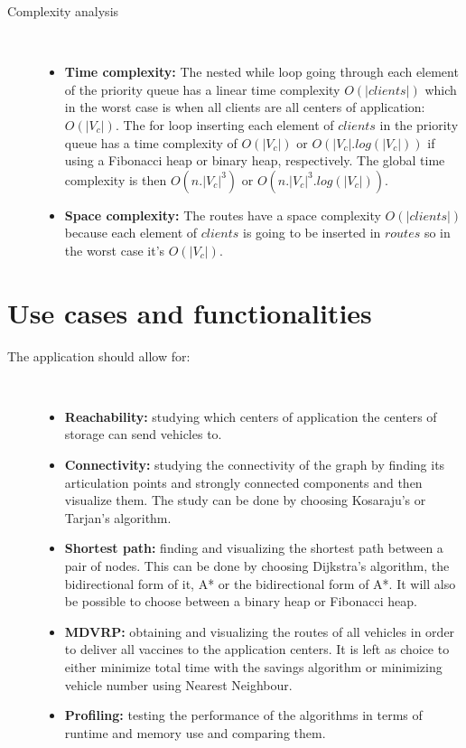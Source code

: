 \documentclass{article}
\begin{document}
\begin{description}
\item[Complexity analysis]\
\begin{itemize}
    \item \textbf{Time complexity:} The nested while loop going through each element of the priority queue has a linear time complexity $O(|clients|)$ which in the worst case is when all clients are all centers of application: $O(|V_c|)$. The for loop inserting each element of $clients$ in the priority queue has a time complexity of $O(|V_c|)$ or $O(|V_c|.log(|V_c|))$ if using a Fibonacci heap or binary heap, respectively. The global time complexity is then $O(n.|V_c|^3)$ or $O(n.|V_c|^3.log(|V_c|))$. 
    \item \textbf{Space complexity:} The routes have a space complexity $O(|clients|)$ because each element of $clients$ is going to be inserted in $routes$ so in the worst case it's $O(|V_c|)$.
\end{itemize}
\end{description}

\newpage
\section{Use cases and functionalities}
\begin{description}
\item[The application should allow for:]\
\begin{itemize}
    \item \textbf{Reachability:} studying which centers of application the centers of storage can send vehicles to.
    \item \textbf{Connectivity:} studying the connectivity of the graph by finding its articulation points and strongly connected components and then visualize them. The study can be done by choosing Kosaraju's or Tarjan's algorithm.
    \item \textbf{Shortest path:} finding and visualizing the shortest path between a pair of nodes. This can be done by choosing Dijkstra's algorithm, the bidirectional form of it, A* or the bidirectional form of A*. It will also be possible to choose between a binary heap or Fibonacci heap. 
    \item \textbf{MDVRP:} obtaining and visualizing the routes of all vehicles in order to deliver all vaccines to the application centers. It is left as choice to either minimize total time with the savings algorithm or minimizing vehicle number using Nearest Neighbour.
    \item \textbf{Profiling:} testing the performance of the algorithms in terms of runtime and memory use and comparing them.
\end{itemize}
\end{description}
\end{document}
